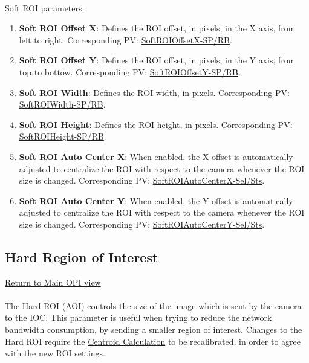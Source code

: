 \documentclass[openany]{article}
\begin{document}
        \paragraph{} Soft ROI parameters:

        \begin{enumerate}
            \item \textbf{Soft ROI Offset X}: Defines the ROI offset, in pixels, in the X axis, from left to right. Corresponding PV: \hyperlink{pv:soft-roi-off-x}{SoftROIOffsetX-SP/RB}.
            \item \textbf{Soft ROI Offset Y}: Defines the ROI offset, in pixels, in the Y axis, from top to bottow. Corresponding PV: \hyperlink{pv:soft-roi-off-y}{SoftROIOffsetY-SP/RB}.
            \item \textbf{Soft ROI Width}: Defines the ROI width, in pixels. Corresponding PV: \hyperlink{pv:soft-roi-width}{SoftROIWidth-SP/RB}.
            \item \textbf{Soft ROI Height}: Defines the ROI height, in pixels. Corresponding PV: \hyperlink{pv:soft-roi-height}{SoftROIHeight-SP/RB}.
            \item \textbf{Soft ROI Auto Center X}: When enabled, the X offset is automatically adjusted to centralize the ROI with respect to the camera whenever the ROI size is changed. Corresponding PV: \hyperlink{pv:soft-roi-auto-center-x}{SoftROIAutoCenterX-Sel/Sts}.
            \item \textbf{Soft ROI Auto Center Y}: When enabled, the Y offset is automatically adjusted to centralize the ROI with respect to the camera whenever the ROI size is changed. Corresponding PV: \hyperlink{pv:soft-roi-auto-center-y}{SoftROIAutoCenterY-Sel/Sts}.
        \end{enumerate}

    \subsection{Hard Region of Interest}\label{sec:hard-roi}

        \hyperref[fig:opi-main]{Return to Main OPI view}

        \paragraph{} The Hard ROI (AOI) controls the size of the image which is sent by the camera to the IOC. This parameter is useful when trying to reduce the network bandwidth consumption, by sending a smaller region of interest. Changes to the Hard ROI require the \hyperref[sec:centroid-calc]{Centroid Calculation} to be recalibrated, in order to agree with the new ROI settings.
\end{document}

